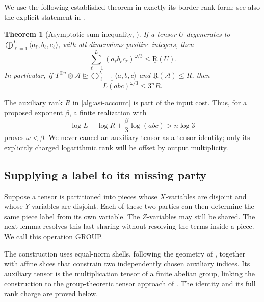 \documentclass[11pt]{article}
\numberwithin{equation}{section}
\newtheorem{theorem}{Theorem}[section]
\theoremstyle{definition}
\theoremstyle{remark}
\begin{document}
We use the following established theorem in exactly its border-rank form;
see also the explicit statement in
\citet[Theorem~3.1]{afl}.

\begin{theorem}[Asymptotic sum inequality, \citet{schonhage}]
\label{thm:asi}
If a tensor \(U\) degenerates to
\(\bigoplus_{\ell=1}^{L}\langle a_\ell,b_\ell,c_\ell\rangle\), with all
dimensions positive integers, then
\[
 \sum_{\ell=1}^{L}(a_\ell b_\ell c_\ell)^{\omega/3}
 \leq\operatorname{\underline R}(U).
\]
In particular, if
\(T^{\otimes n}\otimes\mathcal A\unrhd
\bigoplus_{\ell=1}^{L}\langle a,b,c\rangle\)
and \(\operatorname{\underline R}(\mathcal A)\leq R\), then
\begin{equation}
 L(abc)^{\omega/3}\leq3^nR.
 \label{alg:asi-account}
\end{equation}
\end{theorem}

The auxiliary rank \(R\) in \eqref{alg:asi-account} is part of the input
cost.  Thus, for a proposed exponent \(\beta\), a finite realization with
\begin{equation}
 \log L-\log R+\frac{\beta}{3}\log(abc)>n\log3
 \label{alg:strict-score}
\end{equation}
proves \(\omega<\beta\).  We never cancel an auxiliary tensor as a tensor
identity; only its explicitly charged logarithmic rank will be offset by
output multiplicity.

\subsection{Supplying a label to its missing party}
\label{alg:group-section}
\label{sec:separation}

Suppose a tensor is partitioned into pieces whose \(X\)-variables are
disjoint and whose \(Y\)-variables are disjoint.  Each of these two parties
can then determine the same piece label from its own variable.  The
\(Z\)-variables may still be shared.  The next lemma resolves this last
sharing without resolving the terms inside a piece.  We call this operation
GROUP.

The construction uses equal-norm shells, following the geometry of
\citet{behrend}, together with affine slices that constrain two independently
chosen auxiliary indices.  Its auxiliary tensor is the multiplication
tensor of a finite abelian group, linking the construction to the
group-theoretic tensor approach of \citet{cohn-umans}.  The identity and its
full rank charge are proved below.
\end{document}
